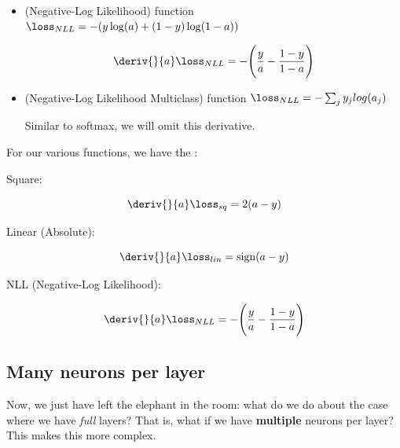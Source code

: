 \begin{itemize}
            \item {} (Negative-Log Likelihood) function $\loss_{NLL} = -( y \log(a) + (1-y) \log(1-a) )$
            
                \begin{equation}
                    \deriv{}{a} \loss_{NLL} = - \Bigg( \frac{y}{a} - \frac{1-y}{1-a} \Bigg)
                \end{equation}
            
            \item {} (Negative-Log Likelihood Multiclass) function $\loss_{NLL} = - \sum_j y_jlog(a_j)$
            
                Similar to softmax, we will omit this derivative.\\
        \end{itemize}
        
        \begin{notation}
            For our various  functions, we have the :
            
            Square:
            
            \begin{equation}
                \deriv{}{a} \loss_{sq} = 2(a-y)
            \end{equation}
            
            Linear (Absolute):
            
            \begin{equation}
                \deriv{}{a} \loss_{lin} = \text{sign}(a-y)
            \end{equation}
            
            NLL (Negative-Log Likelihood):
            
            \begin{equation}
                \deriv{}{a} \loss_{NLL} = - \Bigg( \frac{y}{a} - \frac{1-y}{1-a} \Bigg)
            \end{equation}
        \end{notation}
        
    \secdiv
    
    \subsection{Many neurons per layer}
    
        Now, we just have left the elephant in the room: what do we do about the case where we have \textit{full} layers? That is, what if we have \textbf{multiple} neurons per layer? This makes this more complex.
        
